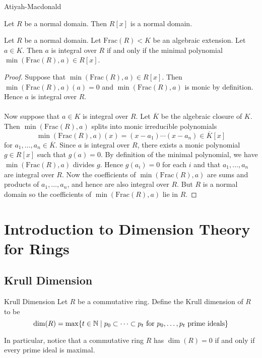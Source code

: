 \documentclass[a4paper]{article}
\begin{document}
Atiyah-Macdonald

\begin{prp}{}{} Let $R$ be a normal domain. Then $R[x]$ is a normal domain. 
\end{prp}

\begin{prp}{}{} Let $R$ be a normal domain. Let $\text{Frac}(R)<K$ be an algebraic extension. Let $a\in K$. Then $a$ is integral over $R$ if and only if the minimal polynomial $\min(\text{Frac}(R),a)\in R[x]$. 
\begin{proof}
Suppose that $\min(\text{Frac}(R),a)\in R[x]$. Then $\min(\text{Frac}(R),a)(a)=0$ and $\min(\text{Frac}(R),a)$ is monic by definition. Hence $a$ is integral over $R$. \\~\\

Now suppose that $a\in K$ is integral over $R$. Let $\overline{K}$ be the algebraic closure of $K$. Then $\min(\text{Frac}(R),a)$ splits into monic irreducible polynomials $$\min(\text{Frac}(R),a)(x)=(x-a_1)\cdots(x-a_n)\in\overline{K}[x]$$ for $a_1,\dots,a_n\in\overline{K}$. Since $a$ is integral over $R$, there exists a monic polynomial $g\in R[x]$ such that $g(a)=0$. By definition of the minimal polynomial, we have $\min(\text{Frac}(R),a)$ divides $g$. Hence $g(a_i)=0$ for each $i$ and that $a_1,\dots,a_n$ are integral over $R$. Now the coefficients of $\min(\text{Frac}(R),a)$ are sums and products of $a_1,\dots,a_n$, and hence are also integral over $R$. But $R$ is a normal domain so the coefficients of $\min(\text{Frac}(R),a)$ lie in $R$. 
\end{proof}
\end{prp}

\pagebreak
\section{Introduction to Dimension Theory for Rings}
\subsection{Krull Dimension}
\begin{defn}{Krull Dimension}{} Let $R$ be a commutative ring. Define the Krull dimension of $R$ to be $$\dim(R)=\max\{t\in\mathbb{N}\;|\;p_0\subset\dots\subset p_t\text{ for }p_0,\dots,p_t\text{ prime ideals}\}$$
\end{defn}

In particular, notice that a commutative ring $R$ has $\dim(R)=0$ if and only if every prime ideal is maximal. 
\end{document}
